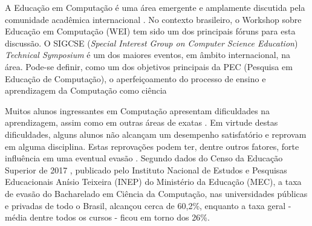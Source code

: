 \documentclass[
	12pt,				%
	openright,			%
	oneside,
	a4paper,			%
	english,			%
	french,				%
	spanish,			%
	brazil,				%
	]{abntex2}
\begin{document}




A Educação em Computação é uma área emergente e amplamente discutida pela comunidade acadêmica internacional \cite{fincher2005mapping}. No contexto brasileiro, o Workshop sobre Educação em Computação (WEI) tem sido um dos principais fóruns para esta discussão. O SIGCSE (\textit{Special Interest Group on Computer Science Education}) \textit{Technical Symposium} é um dos maiores eventos, em âmbito internacional, na área. Pode-se definir, como um dos objetivos principais da PEC (Pesquisa em Educação de Computação), o aperfeiçoamento do processo de ensino e aprendizagem da Computação como ciência \cite{holmboe2001research}

Muitos alunos ingressantes em Computação apresentam dificuldades na aprendizagem, assim como em outras áreas de exatas \cite{blando2015dificuldades}. Em virtude destas dificuldades, alguns alunos não alcançam um desempenho satisfatório e reprovam em alguma disciplina. Estas reprovações podem ter, dentre outros fatores, forte influência em uma eventual evasão \cite{evasaoMatheus2014}. Segundo dados do Censo da Educação Superior de 2017 \cite{Inep2017}, publicado pelo Instituto Nacional de Estudos e Pesquisas Educacionais Anísio Teixeira (INEP) do Ministério da Educação (MEC), a taxa de evasão do Bacharelado em Ciência da Computação, nas universidades públicas e privadas de todo o Brasil, alcançou cerca de 60,2\%, enquanto a taxa geral - média dentre todos os cursos - ficou em torno dos 26\%.
\end{document}
